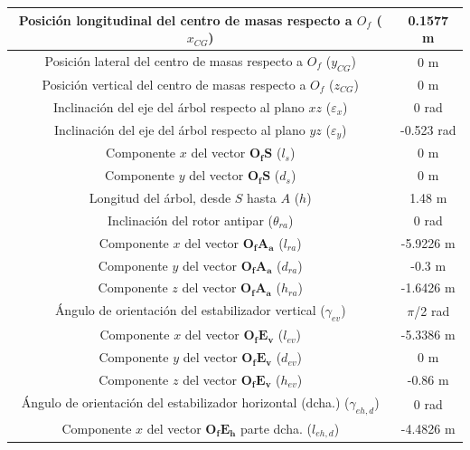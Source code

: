\begin{table}[htbp]
	\centering
	\begin{tabular}{|>{\columncolor{Gray}}c|c|}
		\hline
		\cellcolor{Gray}Posición longitudinal del centro de masas respecto a $O_f$ ($x_{CG}$) & 0.1577 m \\ \hline
		\cellcolor{Gray}Posición lateral del centro de masas respecto a $O_f$ ($y_{CG}$) & 0 m \\ \hline
		\cellcolor{Gray}Posición vertical del centro de masas respecto a $O_f$ ($z_{CG}$) & 0 m \\ \hline
		\cellcolor{Gray}Inclinación del eje del árbol respecto al plano $xz$ ($\varepsilon_x$) & 0 rad \\ \hline
		\cellcolor{Gray}Inclinación del eje del árbol respecto al plano $yz$ ($\varepsilon_y$) & -0.523 rad \\ \hline
		\cellcolor{Gray}Componente $x$ del vector $\boldsymbol{O_fS}$ ($l_s$) & 0 m \\ \hline
		\cellcolor{Gray}Componente $y$ del vector $\boldsymbol{O_fS}$ ($d_s$) & 0 m \\ \hline
		\cellcolor{Gray}Longitud del árbol, desde $S$ hasta $A$ ($h$) & 1.48 m \\ \hline
		\cellcolor{Gray}Inclinación del rotor antipar ($\theta_{ra}$) & 0 rad \\ \hline
		\cellcolor{Gray}Componente $x$ del vector $\boldsymbol{O_fA_a}$ ($l_{ra}$) & -5.9226 m \\ \hline
		\cellcolor{Gray}Componente $y$ del vector $\boldsymbol{O_fA_a}$ ($d_{ra}$) & -0.3 m \\ \hline
		\cellcolor{Gray}Componente $z$ del vector $\boldsymbol{O_fA_a}$ ($h_{ra}$) & -1.6426 m \\ \hline
		\cellcolor{Gray}Ángulo de orientación del estabilizador vertical ($\gamma_{ev}$) & $\pi$/2 rad \\ \hline
		\cellcolor{Gray}Componente $x$ del vector $\boldsymbol{O_fE_v}$ ($l_{ev}$) & -5.3386 m \\ \hline
		\cellcolor{Gray}Componente $y$ del vector $\boldsymbol{O_fE_v}$ ($d_{ev}$) & 0 m \\ \hline
		\cellcolor{Gray}Componente $z$ del vector $\boldsymbol{O_fE_v}$ ($h_{ev}$) & -0.86 m \\ \hline
		\cellcolor{Gray}Ángulo de orientación del estabilizador horizontal (dcha.) ($\gamma_{eh,d}$) & 0 rad \\ \hline
		\cellcolor{Gray}Componente $x$ del vector $\boldsymbol{O_fE_h}$ parte dcha. ($l_{eh,d}$) & -4.4826 m \\ \hline

\end{tabular}
\end{table}
